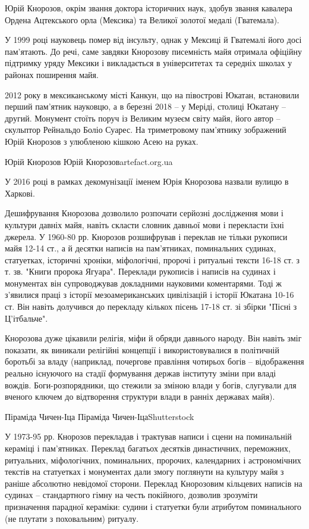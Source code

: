 Юрій Кнорозов, окрім звання доктора історичних наук, здобув звання
кавалера Ордена Ацтекського орла (Мексика) та Великої золотої медалі
(Гватемала).

У 1999 році науковець помер від інсульту, однак у Мексиці й Гватемалі
його досі пам'ятають. До речі, саме завдяки Кнорозову писемність майя
отримала офіційну підтримку уряду Мексики і викладається в університетах
та середніх школах у районах поширення майя.

2012 року в мексиканському місті Канкун, що на півострові Юкатан,
встановили перший пам'ятник науковцю, а в березні 2018 – у Меріді, столиці
Юкатану – другий. Монумент стоїть поруч із Великим музеєм світу майя, його
автор – скульптор Рейнальдо Боліо Суарес. На триметровому пам'ятнику
зображений Юрій Кнорозов з улюбленою кішкою Асею на руках.

Юрій Кнорозов  Юрій Кнорозовartefact.org.ua

У 2016 році в рамках декомунізації іменем Юрія Кнорозова назвали вулицю в
Харкові.

Дешифрування Кнорозова дозволило розпочати серйозні дослідження мови і
культури давніх майя, навіть скласти словник давньої мови і перекласти
їхні джерела. У 1960-80 рр. Кнорозов розшифрував і переклав не тільки
рукописи майя 12-14 ст., а й десятки написів на пам'ятниках, поминальних
судинах, статуетках, історичні хроніки, міфологічні, пророчі і ритуальні
тексти 16-18 ст. з т. зв. "Книги пророка Ягуара". Переклади рукописів і
написів на судинах і монументах він супроводжував докладними науковими
коментарями. Тоді ж з'явилися праці з історії мезоамериканських
цивілізацій і історії Юкатана 10-16 ст. Він навіть долучився до
перекладу кількох пісень 17-18 ст. зі збірки "Пісні з Ц'ітбальче".

Кнорозова дуже цікавили релігія, міфи й обряди давнього народу. Він навіть
зміг показати, як виникали релігійні концепції і використовувалися в
політичній боротьбі за владу (наприклад, почергове правління чотирьох
богів – відображення реально існуючого на стадії формування держав
інституту зміни при владі вождів. Боги-розпорядники, що стежили за зміною
влади у богів, слугували для вченого ключем до відтворення структури влади
в ранніх державах майя).

Піраміда Чичен-Іца  Піраміда Чичен-ІцаShutterstock

У 1973-95 рр. Кнорозов перекладав і трактував написи і сцени на
поминальній кераміці і пам'ятниках. Переклад багатьох десятків
династичних, переможних, ритуальних, міфологічних, поминальних, пророчих,
календарних і астрономічних текстів на статуетках і монументах дали змогу
поглянути на культуру майя з раніше абсолютно невідомої сторони. Переклад
Кнорозовим кільцевих написів на судинах – стандартного гімну на честь
покійного, дозволив зрозуміти призначення парадної кераміки: судини і
статуетки були атрибутом поминального (не плутати з поховальним) ритуалу.


